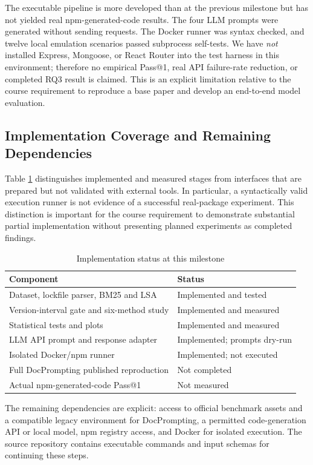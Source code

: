 \documentclass[conference]{IEEEtran}
\begin{document}
The executable pipeline is more developed than at the previous milestone but has not yielded real npm-generated-code results. The four LLM prompts were generated without sending requests. The Docker runner was syntax checked, and twelve local emulation scenarios passed subprocess self-tests. We have \emph{not} installed Express, Mongoose, or React Router into the test harness in this environment; therefore no empirical Pass@1, real API failure-rate reduction, or completed RQ3 result is claimed. This is an explicit limitation relative to the course requirement to reproduce a base paper and develop an end-to-end model evaluation.


\subsection{Implementation Coverage and Remaining Dependencies}
Table \ref{tab:coverage} distinguishes implemented and measured stages from interfaces that are prepared but not validated with external tools. In particular, a syntactically valid execution runner is not evidence of a successful real-package experiment. This distinction is important for the course requirement to demonstrate substantial partial implementation without presenting planned experiments as completed findings.

\begin{table}[t]
\centering
\caption{Implementation status at this milestone}
\label{tab:coverage}
\setlength{\tabcolsep}{3pt}
\begin{tabular}{p{}p{}}
\toprule
Component & Status\\
\midrule
Dataset, lockfile parser, BM25 and LSA & Implemented and tested\\
Version-interval gate and six-method study & Implemented and measured\\
Statistical tests and plots & Implemented and measured\\
LLM API prompt and response adapter & Implemented; prompts dry-run\\
Isolated Docker/npm runner & Implemented; not executed\\
Full DocPrompting published reproduction & Not completed\\
Actual npm-generated-code Pass@1 & Not measured\\
\bottomrule
\end{tabular}
\end{table}

The remaining dependencies are explicit: access to official benchmark assets and a compatible legacy environment for DocPrompting, a permitted code-generation API or local model, npm registry access, and Docker for isolated execution. The source repository contains executable commands and input schemas for continuing these steps.
\end{document}
